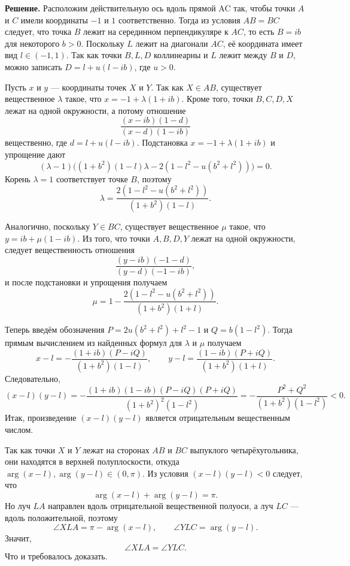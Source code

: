 \textbf{Решение.} Расположим действительную ось вдоль прямой AC так, чтобы точки $A$ и $C$ имели координаты $-1$ и $1$ соответственно. Тогда из условия $AB=BC$ следует, что точка $B$ лежит на серединном перпендикуляре к $AC$, то есть $B=ib$ для некоторого $b>0$. Поскольку $L$ лежит на диагонали $AC$, её  координата имеет вид $l\in(-1,1)$. Так как точки $B,L,D$ коллинеарны и $L$ лежит между $B$ и $D$, можно записать $D=l+u(l-ib)$, где $u>0$.

Пусть $x$ и $y$ --- координаты точек $X$ и $Y$. Так как $X\in AB$, существует вещественное $\lambda$ такое, что $x=-1+\lambda(1+ib)$. Кроме того, точки $B,C,D,X$ лежат на одной окружности, а потому отношение
\[
\frac{(x-ib)(1-d)}{(x-d)(1-ib)}
\]
вещественно, где $d=l+u(l-ib)$. Подстановка $x=-1+\lambda(1+ib)$ и упрощение дают
\[
(\lambda-1)\bigl((1+b^2)(1-l)\lambda-2(1-l^2-u(b^2+l^2))\bigr)=0.
\]
Корень $\lambda=1$ соответствует точке $B$, поэтому
\[
\lambda=\frac{2(1-l^2-u(b^2+l^2))}{(1+b^2)(1-l)}.
\]

Аналогично, поскольку $Y\in BC$, существует вещественное $\mu$ такое, что $y=ib+\mu(1-ib)$. Из того, что точки $A,B,D,Y$ лежат на одной окружности, следует вещественность отношения
\[
\frac{(y-ib)(-1-d)}{(y-d)(-1-ib)},
\]
и после подстановки и упрощения получаем
\[
\mu=1-\frac{2(1-l^2-u(b^2+l^2))}{(1+b^2)(1+l)}.
\]

Теперь введём обозначения $P=2u(b^2+l^2)+l^2-1$ и $Q=b(1-l^2)$. Тогда прямым вычислением из найденных формул для $\lambda$ и $\mu$ получаем
\[
x-l=-\frac{(1+ib)(P-iQ)}{(1+b^2)(1-l)},\qquad y-l=\frac{(1-ib)(P+iQ)}{(1+b^2)(1+l)}.
\]
Следовательно,
\[
(x-l)(y-l)=-\frac{(1+ib)(1-ib)(P-iQ)(P+iQ)}{(1+b^2)^2(1-l^2)}=-\frac{P^2+Q^2}{(1+b^2)(1-l^2)}<0.
\]
Итак, произведение $(x-l)(y-l)$ является отрицательным вещественным числом.

Так как точки $X$ и $Y$ лежат на сторонах $AB$ и $BC$ выпуклого четырёхугольника, они находятся в верхней полуплоскости, откуда $\arg(x-l),\arg(y-l)\in(0,\pi)$. Из условия $(x-l)(y-l)<0$ следует, что
\[
\arg(x-l)+\arg(y-l)=\pi.
\]
Но луч $LA$ направлен вдоль отрицательной вещественной полуоси, а луч $LC$ --- вдоль положительной, поэтому
\[
\angle XLA=\pi-\arg(x-l),\qquad \angle YLC=\arg(y-l).
\]
Значит,
\[
\angle XLA=\angle YLC.
\]
Что и требовалось доказать.